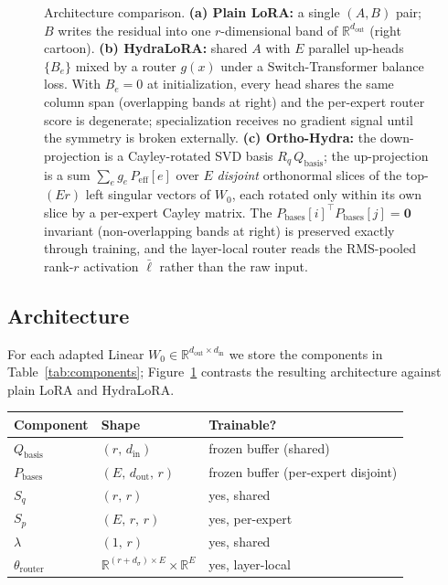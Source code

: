 \documentclass[10pt]{article}
\newcommand{\Rb}{\mathbb{R}}
\newcommand{\T}{^{\!\top}}
\newcommand{\Peff}{P_{\mathrm{eff}}}
\newcommand{\Qbasis}{Q_{\mathrm{basis}}}
\newcommand{\Pbases}{P_{\mathrm{bases}}}
\begin{document}
\begin{figure}[t]
{\begin{tikzpicture}
\end{tikzpicture}}
\caption{Architecture comparison.
\textbf{(a) Plain LoRA:} a single $(A, B)$ pair; $B$ writes the
residual into one $r$-dimensional band of
$\mathbb{R}^{d_{\mathrm{out}}}$ (right cartoon).
\textbf{(b) HydraLoRA:} shared $A$ with $E$ parallel up-heads
$\{B_e\}$ mixed by a router $g(x)$ under a Switch-Transformer balance
loss. With $B_e\!=\!0$ at initialization, every head shares the same
column span (overlapping bands at right) and the per-expert router
score is degenerate; specialization receives no gradient signal until
the symmetry is broken externally.
\textbf{(c) Ortho-Hydra:} the down-projection is a Cayley-rotated SVD
basis $R_q\,\Qbasis$; the up-projection is a sum
$\sum_e g_e\, \Peff[e]$ over $E$ \emph{disjoint} orthonormal slices
of the top-$(Er)$ left singular vectors of $W_0$, each rotated only
within its own slice by a per-expert Cayley matrix. The
$\Pbases[i]\T\Pbases[j]\!=\!\mathbf{0}$ invariant
(non-overlapping bands at right) is preserved exactly through training,
and the layer-local router reads the RMS-pooled rank-$r$ activation
$\bar\ell$ rather than the raw input.}
\label{fig:archs}
\end{figure}

\subsection{Architecture}

For each adapted Linear $W_0 \in \Rb^{d_{\mathrm{out}}\times
d_{\mathrm{in}}}$ we store the components in
Table~\ref{tab:components}; Figure~\ref{fig:archs} contrasts the
resulting architecture against plain LoRA and HydraLoRA.

\begin{center}
\small
\begin{tabular}{@{}lll@{}}
\toprule
Component & Shape & Trainable? \\
\midrule
$\Qbasis$ & $(r,\, d_{\mathrm{in}})$ & frozen buffer (shared) \\
$\Pbases$ & $(E,\, d_{\mathrm{out}},\, r)$ & frozen buffer (per-expert disjoint) \\
$S_q$ & $(r,\, r)$ & yes, shared \\
$S_p$ & $(E,\, r,\, r)$ & yes, per-expert \\
$\lambda$ & $(1,\, r)$ & yes, shared \\
$\theta_{\mathrm{router}}$ & $\Rb^{(r+d_\sigma)\times E} \times \Rb^E$ & yes, layer-local \\
\bottomrule
\end{tabular}
\end{center}
\label{tab:components}
\end{document}

